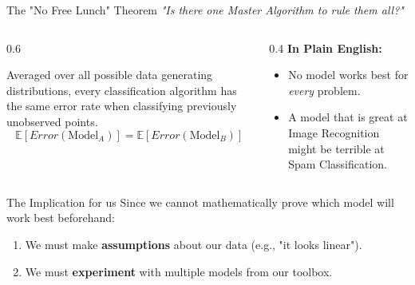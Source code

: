 \begin{frame}{The "No Free Lunch" Theorem}
    \centering
    \textit{"Is there one Master Algorithm to rule them all?"}
    \normalsize
    
    \begin{columns}[c]
        \begin{column}{0.6\textwidth}
            \begin{tcolorbox}[colback=yellow!10, colframe=orange!80!black, title=\textbf{The Theorem (Wolpert, 1996)}]
                Averaged over all possible data generating distributions, every classification algorithm has the same error rate when classifying previously unobserved points.
                \vspace{-1mm}
                $$ \mathbb{E}[Error(\text{Model}_A)] = \mathbb{E}[Error(\text{Model}_B)] $$
            \end{tcolorbox}
        \end{column}
        \begin{column}{0.4\textwidth}
            \centering
            \textbf{In Plain English:}
            \vspace{0.5em}
            \begin{itemize}
                \item No model works best for \textit{every} problem.
                \item A model that is great at Image Recognition might be terrible at Spam Classification.
            \end{itemize}
        \end{column}
    \end{columns}

    \begin{alertblock}{The Implication for us}
        Since we cannot mathematically prove which model will work best beforehand:
        \begin{enumerate}
            \item We must make \textbf{assumptions} about our data (e.g., "it looks linear").
            \item We must \textbf{experiment} with multiple models from our toolbox.
        \end{enumerate}
    \end{alertblock}
\end{frame}

